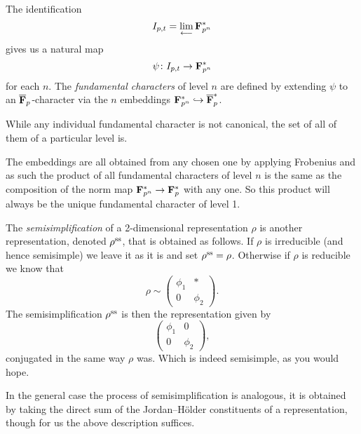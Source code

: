 \documentclass[a4paper,12pt]{article}
\begin{document}
\begin{defn}\label{def:fund}
The identification
\[
I_{p,t}  =  \lim_{\longleftarrow} \mathbf{F}_{p^n}^*
\]
gives us a natural map
\[
\psi\colon I_{p,t} \to \mathbf{F}_{p^n}^*
\]
for each $n$.
The \emph{fundamental characters} of level $n$ are defined by extending $\psi$ to an $\overline{\mathbf{F}}_p$-character via the $n$ embeddings $\mathbf{F}_{p^n}^* \hookrightarrow \overline{\mathbf{F}}_p^*$.

While any individual fundamental character is not canonical, the set of all of them of a particular level is.
\end{defn}

\begin{rmk}\label{rmk:prodchar}
The embeddings are all obtained from any chosen one by applying Frobenius and as such the product of all fundamental characters of level $n$ is the same as the composition of the norm map $\mathbf{F}_{p^n}^* \to \mathbf{F}_p^*$ with any one.
So this product will always be the unique fundamental character of level 1. %
\end{rmk}



\begin{defn}\label{def:semisimp}
The \emph{semisimplification} of a 2-dimensional representation $\rho$ is another representation, denoted $\rho^\text{ss}$, that is obtained as follows.
If $\rho$ is irreducible (and hence semisimple) we leave it as it is and set $\rho^\text{ss} = \rho$.
Otherwise if $\rho$ is reducible we know that
\[
\rho \sim
\begin{pmatrix}
\phi_1 & * \\
0      & \phi_2
\end{pmatrix}.
\]
The semisimplification $\rho^\text{ss}$ is then the representation given by
\[
\begin{pmatrix}
\phi_1 & 0 \\
0      & \phi_2
\end{pmatrix},
\]
conjugated in the same way $\rho$ was.
Which is indeed semisimple, as you would hope.

In the general case the process of semisimplification is analogous, it is obtained by taking the direct sum of the Jordan--H\"older constituents of a representation, though for us the above description suffices.
\end{defn}
\end{document}
